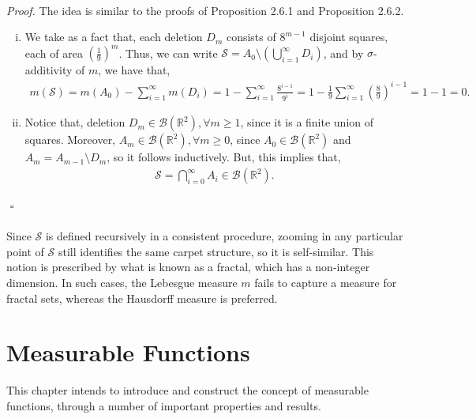 \documentclass{article}
\begin{document}
\noindent{}\\\\\\
\textit{Proof.} The idea is similar to the proofs of Proposition 2.6.1 and Proposition 2.6.2.
\begin{enumerate}[(i)]
	\item We take as a fact that, each deletion $D_m$ consists of $8^{m-1}$ disjoint squares, each of area $(\frac{1}{9})^m$. Thus, we can write $\mathcal{S} = A_0 \setminus (\bigcup_{i=1}^{\infty}D_i)$, and by $\sigma$-additivity of $m$, we have that,
	\begin{eqnarray}
	\nonumber
	m(\mathcal{S}) = m(A_0) - \sum_{i=1}^{\infty}m(D_i) = 1 - \sum_{i=1}^{\infty}\frac{8^{i-1}}{9^i} = 1 - \frac{1}{9}\sum_{i=1}^{\infty}\left(\frac{8}{9}\right)^{i-1} = 1 - 1 = 0.
	\end{eqnarray}
	\item Notice that, deletion $D_m \in \mathcal{B}(\mathbb{R}^2), \forall m \geq 1$, since it is a finite union of squares. Moreover, $A_m \in \mathcal{B}(\mathbb{R}^2), \forall m \geq 0$, since $A_0 \in \mathcal{B}(\mathbb{R}^2)$ and $A_m = A_{m-1} \setminus D_m$, so it follows inductively. But, this implies that,
	\begin{eqnarray}
	\nonumber
	\mathcal{S} = \bigcap_{i=0}^{\infty}A_i \in \mathcal{B}(\mathbb{R}^2).
	\end{eqnarray}
\end{enumerate}
${}$ \hfill $\square$ \\\\
Since $\mathcal{S}$ is defined recursively in a consistent procedure, zooming in any particular point of $\mathcal{S}$ still identifies the same carpet structure, so it is self-similar. This notion is prescribed by what is known as a fractal, which has a non-integer dimension. In such cases, the Lebesgue measure $m$ fails to capture a measure for fractal sets, whereas the Hausdorff measure is preferred.
\newpage
\section{Measurable Functions}
This chapter intends to introduce and construct the concept of measurable functions, through a number of important properties and results.
\end{document}
